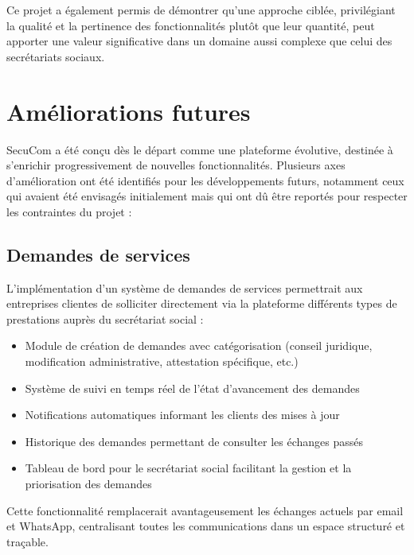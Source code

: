 Ce projet a également permis de démontrer qu'une approche ciblée, privilégiant la qualité et la pertinence des fonctionnalités plutôt que leur quantité, peut apporter une valeur significative dans un domaine aussi complexe que celui des secrétariats sociaux.

\section*{Améliorations futures}

SecuCom a été conçu dès le départ comme une plateforme évolutive, destinée à s'enrichir progressivement de nouvelles fonctionnalités. Plusieurs axes d'amélioration ont été identifiés pour les développements futurs, notamment ceux qui avaient été envisagés initialement mais qui ont dû être reportés pour respecter les contraintes du projet :

\newpage
\subsection*{Demandes de services}

L'implémentation d'un système de demandes de services permettrait aux entreprises clientes de solliciter directement via la plateforme différents types de prestations auprès du secrétariat social :

\begin{itemize}[leftmargin=*,label=\textcolor{darkgray}{$\bullet$},itemsep=0.3em]
  \item Module de création de demandes avec catégorisation (conseil juridique, modification administrative, attestation spécifique, etc.)
  \item Système de suivi en temps réel de l'état d'avancement des demandes
  \item Notifications automatiques informant les clients des mises à jour
  \item Historique des demandes permettant de consulter les échanges passés
  \item Tableau de bord pour le secrétariat social facilitant la gestion et la priorisation des demandes
\end{itemize}

Cette fonctionnalité remplacerait avantageusement les échanges actuels par email et WhatsApp, centralisant toutes les communications dans un espace structuré et traçable.

